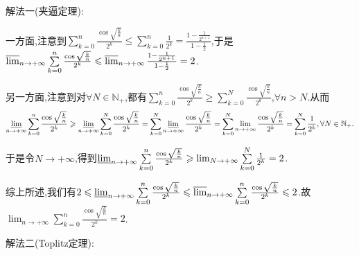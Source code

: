 \documentclass[../../main.tex]{subfiles}
\begin{document}
\begin{solution}
{\color{blue}解法一(夹逼定理):}

一方面,注意到\(\sum\limits_{k = 0}^{n}\frac{\cos\sqrt{\frac{k}{n}}}{2^k} \leqslant \sum\limits_{k = 0}^{n}\frac{1}{2^k} = \frac{1 - \frac{1}{2^{n + 1}}}{1 - \frac{1}{2}}\),于是
$\varlimsup_{n \to +\infty}\sum\limits_{k = 0}^{n}\frac{\cos\sqrt{\frac{k}{n}}}{2^k} \leqslant \varlimsup_{n \to +\infty}\frac{1 - \frac{1}{2^{n + 1}}}{1 - \frac{1}{2}} = 2$.

另一方面,注意到对\(\forall N \in \mathbb{N}_+\),都有\(\sum\limits_{k = 0}^{n}\frac{\cos\sqrt{\frac{k}{n}}}{2^k} \geqslant \sum\limits_{k = 0}^{N}\frac{\cos\sqrt{\frac{k}{n}}}{2^k}\),$\forall n>N$.从而
\begin{align*}
\varliminf_{n \to +\infty}\sum\limits_{k = 0}^{n}\frac{\cos\sqrt{\frac{k}{n}}}{2^k} \geqslant \varliminf_{n \to +\infty}\sum\limits_{k = 0}^{N}\frac{\cos\sqrt{\frac{k}{n}}}{2^k} = \sum\limits_{k = 0}^{N}\varliminf_{n \to +\infty}\frac{\cos\sqrt{\frac{k}{n}}}{2^k} = \sum\limits_{k = 0}^{N}\lim_{n \to +\infty}\frac{\cos\sqrt{\frac{k}{n}}}{2^k} = \sum\limits_{k = 0}^{N}\frac{1}{2^k},\forall N \in \mathbb{N}_+.
\end{align*}

于是令\(N \to +\infty\),得到\(\varliminf_{n \to +\infty}\sum\limits_{k = 0}^{n}\frac{\cos\sqrt{\frac{k}{n}}}{2^k} \geqslant \lim_{N \to +\infty}\sum\limits_{k = 0}^{N}\frac{1}{2^k} = 2\).

综上所述,我们有\(2 \leqslant \varliminf_{n \to +\infty}\sum\limits_{k = 0}^{n}\frac{\cos\sqrt{\frac{k}{n}}}{2^k} \leqslant \varlimsup_{n \to +\infty}\sum\limits_{k = 0}^{n}\frac{\cos\sqrt{\frac{k}{n}}}{2^k} \leqslant 2\).故\(\lim_{n \to +\infty}\sum\limits_{k = 0}^{n}\frac{\cos\sqrt{\frac{k}{n}}}{2^k} = 2\). 

{\color{blue}解法二(Toplitz定理):}
\end{solution}
\end{document}
